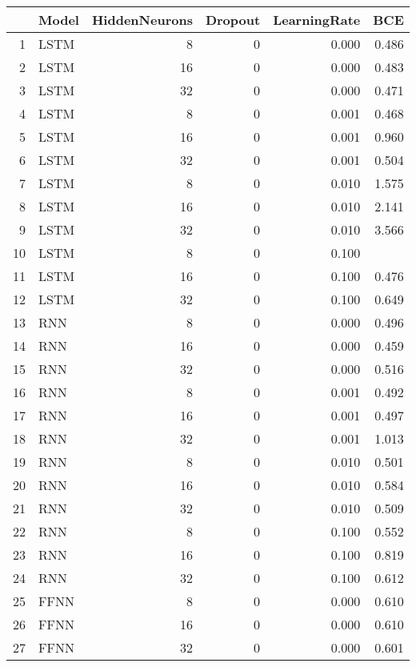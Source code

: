 \begin{table}[ht]
\centering
\begin{tabular}{rlrrrr}
  \hline
 & Model & HiddenNeurons & Dropout & LearningRate & BCE \\ 
  \hline
1 & LSTM &    8 &    0 & 0.000 & 0.486 \\ 
  2 & LSTM &   16 &    0 & 0.000 & 0.483 \\ 
  3 & LSTM &   32 &    0 & 0.000 & 0.471 \\ 
  4 & LSTM &    8 &    0 & 0.001 & 0.468 \\ 
  5 & LSTM &   16 &    0 & 0.001 & 0.960 \\ 
  6 & LSTM &   32 &    0 & 0.001 & 0.504 \\ 
  7 & LSTM &    8 &    0 & 0.010 & 1.575 \\ 
  8 & LSTM &   16 &    0 & 0.010 & 2.141 \\ 
  9 & LSTM &   32 &    0 & 0.010 & 3.566 \\ 
  10 & LSTM &    8 &    0 & 0.100 &  \\ 
  11 & LSTM &   16 &    0 & 0.100 & 0.476 \\ 
  12 & LSTM &   32 &    0 & 0.100 & 0.649 \\ 
  13 & RNN &    8 &    0 & 0.000 & 0.496 \\ 
  14 & RNN &   16 &    0 & 0.000 & 0.459 \\ 
  15 & RNN &   32 &    0 & 0.000 & 0.516 \\ 
  16 & RNN &    8 &    0 & 0.001 & 0.492 \\ 
  17 & RNN &   16 &    0 & 0.001 & 0.497 \\ 
  18 & RNN &   32 &    0 & 0.001 & 1.013 \\ 
  19 & RNN &    8 &    0 & 0.010 & 0.501 \\ 
  20 & RNN &   16 &    0 & 0.010 & 0.584 \\ 
  21 & RNN &   32 &    0 & 0.010 & 0.509 \\ 
  22 & RNN &    8 &    0 & 0.100 & 0.552 \\ 
  23 & RNN &   16 &    0 & 0.100 & 0.819 \\ 
  24 & RNN &   32 &    0 & 0.100 & 0.612 \\ 
  25 & FFNN &    8 &    0 & 0.000 & 0.610 \\ 
  26 & FFNN &   16 &    0 & 0.000 & 0.610 \\ 
  27 & FFNN &   32 &    0 & 0.000 & 0.601 \\ 

\end{tabular}
\end{table}
